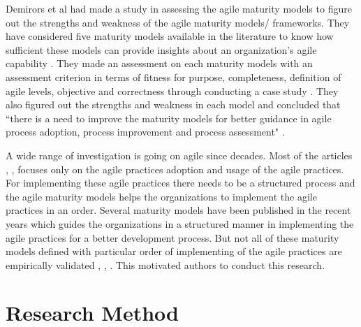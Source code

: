 \documentclass[a4paper,oneside]{bth}
\begin{document}
Demirors et al had made a study in assessing the agile maturity models to figure out the strengths and weakness of the agile maturity models/ frameworks. They have considered five maturity models available in the literature to know how sufficient these models can provide insights about an organization’s agile capability \cite{ozcan-top_assessment_2013}. They made an assessment on each maturity models with an assessment criterion in terms of fitness for purpose, completeness, definition of agile levels, objective and correctness through conducting a case study \cite{ozcan-top_assessment_2013}. They also figured out the strengths and weakness in each model and concluded that “there is a need to improve the maturity models for better guidance in agile process adoption, process improvement and process assessment" \cite{ozcan-top_assessment_2013}.

A wide range of investigation is going on agile since decades. Most of the articles \cite{melnik_perceptions_2002}, \cite{pikkarainen_deploying_2005}, \cite{sfetsos_empirical_2010} focuses only on the agile practices adoption and usage of the agile practices. For implementing these agile practices there needs to be a structured process and the agile maturity models helps the organizations to implement the agile practices in an order. Several maturity models have been published in the recent years which guides the organizations in a structured manner in implementing the agile practices for a better development process. But not all of these maturity models defined with particular order of implementing of the agile practices are empirically validated \cite{schweigert_agile_2013}, \cite{patel_agile_2009}, \cite{ozcan-top_assessment_2013}. This motivated authors to conduct this research.


\chapter{Research Method}
\end{document}
